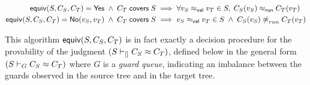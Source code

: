 \documentclass[12pt]{article}
\begin{document}

\begin{align*}
 \SimpleEquiv S {C_S} {C_T} = \Yes \;\land\; \covers {C_T} S
 & \implies
 \forall {\vrel {v_S} {v_T}} \in S,\; \runrel {C_S(v_S)} {C_T(v_T)}
\\
 \SimpleEquiv S {C_S} {C_T} = \No {v_S} {v_T} \;\land\; \covers {C_T} S
 & \implies
 \vrel {v_S} {v_T} \in S \;\land\; {\nparamrel{run} {C_S(v_S)} {C_T(v_T)}}
\end{align*}

This algorithm $\SimpleEquiv S {C_S} {C_T}$ is in fact exactly
a decision procedure for the provability of the judgment
$(\Equivrel S {C_S} {C_T} \emptyqueue)$, defined below in the general
form $(\Equivrel S {C_S} {C_T} G)$ where $G$ is a \emph{guard queue},
indicating an imbalance between the guards observed in the source tree
and in the target tree.
\end{document}

